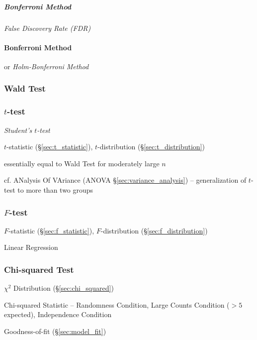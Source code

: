 \subparagraph{Bonferroni Method}\label{sec:bonferroni_method}\hfill

\emph{False Discovery Rate (FDR)}



\paragraph{Bonferroni Method}\label{sec:bonferroni_method}\hfill

or \emph{Holm-Bonferroni Method}



\subsubsection{Wald Test}\label{sec:wald_test}

\subsubsection{$t$-test}\label{sec:t_test}

\emph{Student's $t$-test}

\fist $t$-statistic (\S\ref{sec:t_statistic}),
$t$-distribution (\S\ref{sec:t_distribution})

essentially equal to Wald Test for moderately large $n$

\fist cf. ANalysis Of VAriance (ANOVA \S\ref{sec:variance_analysis}) --
generalization of $t$-test to more than two groups



\subsubsection{$F$-test}\label{sec:f_test}

\fist $F$-statistic (\S\ref{sec:f_statistic}),
$F$-distribution (\S\ref{sec:f_distribution})

Linear Regression



\subsubsection{Chi-squared Test}\label{sec:chi_squared_test}

$\chi^2$ Distribution (\S\ref{sec:chi_squared})

Chi-squared Statistic -- Randomness Condition, Large Counts Condition ($>5$
expected), Independence Condition

Goodness-of-fit (\S\ref{sec:model_fit})

